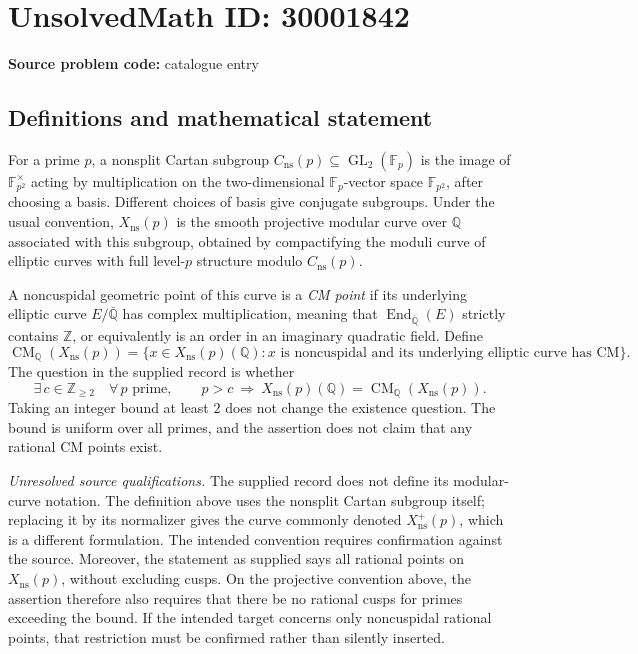 \documentclass[11pt]{article}
\newcommand{\Z}{\mathbb{Z}}
\newcommand{\Q}{\mathbb{Q}}
\newcommand{\F}{\mathbb{F}}
\begin{document}
\section*{UnsolvedMath ID: 30001842}
\textbf{Source problem code:} catalogue entry
\subsection{Definitions and mathematical statement}
For a prime \(p\), a nonsplit Cartan subgroup \(C_{\mathrm{ns}}(p)\subseteq\operatorname{GL}_2(\F_p)\) is the image of \(\F_{p^2}^{\times}\) acting by multiplication on the two-dimensional \(\F_p\)-vector space \(\F_{p^2}\), after choosing a basis. Different choices of basis give conjugate subgroups. Under the usual convention, \(X_{\mathrm{ns}}(p)\) is the smooth projective modular curve over \(\Q\) associated with this subgroup, obtained by compactifying the moduli curve of elliptic curves with full level-\(p\) structure modulo \(C_{\mathrm{ns}}(p)\).

A noncuspidal geometric point of this curve is a \emph{CM point} if its underlying elliptic curve \(E/\overline{\Q}\) has complex multiplication, meaning that \(\operatorname{End}_{\overline{\Q}}(E)\) strictly contains \(\Z\), or equivalently is an order in an imaginary quadratic field. Define
\[
\operatorname{CM}_{\Q}(X_{\mathrm{ns}}(p))
=\{x\in X_{\mathrm{ns}}(p)(\Q):x\text{ is noncuspidal and its underlying elliptic curve has CM}\}.
\]
The question in the supplied record is whether
\[
\exists\,c\in\Z_{\geq 2}\quad
\forall\,p\text{ prime},\qquad
p>c\ \Longrightarrow\ 
X_{\mathrm{ns}}(p)(\Q)=\operatorname{CM}_{\Q}(X_{\mathrm{ns}}(p)).
\]
Taking an integer bound at least \(2\) does not change the existence question. The bound is uniform over all primes, and the assertion does not claim that any rational CM points exist.

\emph{Unresolved source qualifications.} The supplied record does not define its modular-curve notation. The definition above uses the nonsplit Cartan subgroup itself; replacing it by its normalizer gives the curve commonly denoted \(X_{\mathrm{ns}}^{+}(p)\), which is a different formulation. The intended convention requires confirmation against the source. Moreover, the statement as supplied says all rational points on \(X_{\mathrm{ns}}(p)\), without excluding cusps. On the projective convention above, the assertion therefore also requires that there be no rational cusps for primes exceeding the bound. If the intended target concerns only noncuspidal rational points, that restriction must be confirmed rather than silently inserted.
\end{document}

